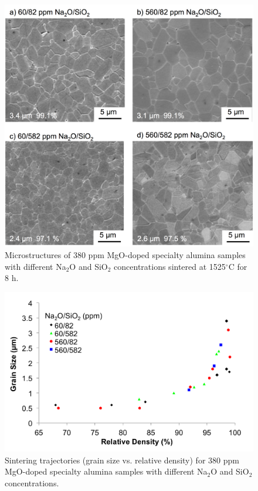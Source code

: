 \newpage
\begin{figure}[H]
	\centering
	\includegraphics[width=\textwidth]{Chapter-3/Figures/Figure4.png}
	\caption{Microstructures of 380 ppm MgO-doped specialty alumina samples with different Na$_{2}$O and SiO$_{2}$ concentrations sintered at 1525$^{\circ}$C for 8 h.}
	\label{Ch3-figure:Figure4}
\end{figure}

\newpage
\begin{figure}[H]
	\centering
	\includegraphics[width=\textwidth]{Chapter-3/Figures/Figure5.png}
	\caption{Sintering trajectories (grain size vs. relative density) for 380 ppm MgO-doped specialty alumina samples with different Na$_{2}$O and SiO$_{2}$ concentrations.}
	\label{Ch3-figure:Figure5}
\end{figure}

